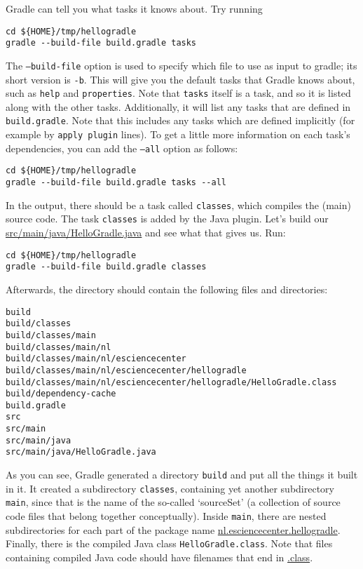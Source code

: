 Gradle can tell you what tasks it knows about. Try running
\begin{lstlisting}[style=basic,style=bash]
cd ${HOME}/tmp/hellogradle
gradle --build-file build.gradle tasks
\end{lstlisting} %
The \texttt{--build-file} option is used to specify which file to use as input to gradle; its short version is \texttt{-b}. This will give you the default tasks that Gradle knows about, such as \texttt{help} and \texttt{properties}. Note that \texttt{tasks} itself is a task, and so it is listed along with the other tasks. Additionally, it will list any tasks that are defined in \texttt{build.gradle}. Note that this includes any tasks which are defined implicitly (for example by \texttt{apply plugin} lines). To get a little more information on each task's dependencies, you can add the \texttt{--all} option as follows:
\begin{lstlisting}[style=basic,style=bash]
cd ${HOME}/tmp/hellogradle
gradle --build-file build.gradle tasks --all
\end{lstlisting} %

In the output, there should be a task called \texttt{classes}, which compiles the (main) source code. The task \texttt{classes} is added by the Java plugin. Let's build our \url{src/main/java/HelloGradle.java} and see what that gives us. Run:
\begin{lstlisting}[style=basic,style=bash]
cd ${HOME}/tmp/hellogradle
gradle --build-file build.gradle classes
\end{lstlisting} %
Afterwards, the directory should contain the following files and directories:
\begin{lstlisting}[style=basic,style=bash]
build
build/classes
build/classes/main
build/classes/main/nl
build/classes/main/nl/esciencecenter
build/classes/main/nl/esciencecenter/hellogradle
build/classes/main/nl/esciencecenter/hellogradle/HelloGradle.class
build/dependency-cache
build.gradle
src
src/main
src/main/java
src/main/java/HelloGradle.java
\end{lstlisting}
As you can see, Gradle generated a directory \texttt{build} and put all the things it built in it. It created a subdirectory \texttt{classes}, containing yet another subdirectory \texttt{main}, since that is the name of the so-called \mbox{`sourceSet'} (a collection of source code files that belong together conceptually). Inside \texttt{main}, there are nested subdirectories for each part of the package name \url{nl.esciencecenter.hellogradle}. Finally, there is the compiled Java class \texttt{HelloGradle.class}. Note that files containing compiled Java code should have filenames that end in \url{.class}.

